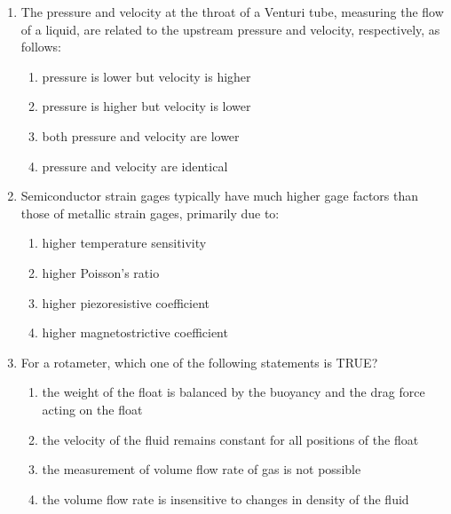 \documentclass[journal,12pt,onecolumn]{IEEEtran}
\theoremstyle{remark}
\begin{document}
\begin{enumerate}
    \hfill{}

    
    
    \item The pressure and velocity at the throat of a Venturi tube, measuring the flow of a liquid, are related to the upstream pressure and velocity, respectively, as follows:

    \hfill{}
    \begin{enumerate}
        \item pressure is lower but velocity is higher
        \item pressure is higher but velocity is lower
        \item both pressure and velocity are lower
        \item pressure and velocity are identical
    \end{enumerate}

    
    
    \item Semiconductor strain gages typically have much higher gage factors than those of metallic strain gages, primarily due to:

    \hfill{}
    \begin{enumerate}
        \item higher temperature sensitivity
        \item higher Poisson's ratio
        \item higher piezoresistive coefficient
        \item higher magnetostrictive coefficient
    \end{enumerate}

    
    
    \item For a rotameter, which one of the following statements is TRUE?

    \hfill{}
    \begin{enumerate}
        \item the weight of the float is balanced by the buoyancy and the drag force acting on the float
        \item the velocity of the fluid remains constant for all positions of the float
        \item the measurement of volume flow rate of gas is not possible
        \item the volume flow rate is insensitive to changes in density of the fluid
    \end{enumerate}


\end{enumerate}
\end{document}
